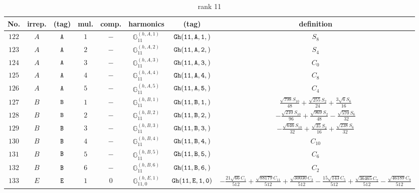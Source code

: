 \documentclass[fleqn,8pt]{jsarticle}
\begin{document}
\begin{table}[ht!]
\begin{center}
\caption{rank 11}
\renewcommand{\arraystretch}{1.3}
\begin{tabular}{cccccccc} \hline \hline
No. & irrep. & (tag) & mul. & comp. & harmonics & (tag) & definition \\ \hline
$ 122 $ & $ A $ & $ {\tt A} $ & $ 1 $ & $ - $ & $ \mathbb{G}_{11}^{(h,A,1)} $ & $ {\tt Gh(11,A,1,)} $ & $ S_{8} $ \\
$ 123 $ & $ A $ & $ {\tt A} $ & $ 2 $ & $ - $ & $ \mathbb{G}_{11}^{(h,A,2)} $ & $ {\tt Gh(11,A,2,)} $ & $ S_{4} $ \\
$ 124 $ & $ A $ & $ {\tt A} $ & $ 3 $ & $ - $ & $ \mathbb{G}_{11}^{(h,A,3)} $ & $ {\tt Gh(11,A,3,)} $ & $ C_{0} $ \\
$ 125 $ & $ A $ & $ {\tt A} $ & $ 4 $ & $ - $ & $ \mathbb{G}_{11}^{(h,A,4)} $ & $ {\tt Gh(11,A,4,)} $ & $ C_{8} $ \\
$ 126 $ & $ A $ & $ {\tt A} $ & $ 5 $ & $ - $ & $ \mathbb{G}_{11}^{(h,A,5)} $ & $ {\tt Gh(11,A,5,)} $ & $ C_{4} $ \\
$ 127 $ & $ B $ & $ {\tt B} $ & $ 1 $ & $ - $ & $ \mathbb{G}_{11}^{(h,B,1)} $ & $ {\tt Gh(11,B,1,)} $ & $ \frac{\sqrt{798} S_{10}}{48} + \frac{\sqrt{255} S_{2}}{24} + \frac{3 \sqrt{6} S_{6}}{16} $ \\
$ 128 $ & $ B $ & $ {\tt B} $ & $ 2 $ & $ - $ & $ \mathbb{G}_{11}^{(h,B,2)} $ & $ {\tt Gh(11,B,2,)} $ & $ - \frac{\sqrt{210} S_{10}}{96} + \frac{\sqrt{969} S_{2}}{48} - \frac{\sqrt{570} S_{6}}{32} $ \\
$ 129 $ & $ B $ & $ {\tt B} $ & $ 3 $ & $ - $ & $ \mathbb{G}_{11}^{(h,B,3)} $ & $ {\tt Gh(11,B,3,)} $ & $ - \frac{\sqrt{646} S_{10}}{32} + \frac{\sqrt{35} S_{2}}{16} + \frac{\sqrt{238} S_{6}}{32} $ \\
$ 130 $ & $ B $ & $ {\tt B} $ & $ 4 $ & $ - $ & $ \mathbb{G}_{11}^{(h,B,4)} $ & $ {\tt Gh(11,B,4,)} $ & $ C_{10} $ \\
$ 131 $ & $ B $ & $ {\tt B} $ & $ 5 $ & $ - $ & $ \mathbb{G}_{11}^{(h,B,5)} $ & $ {\tt Gh(11,B,5,)} $ & $ C_{6} $ \\
$ 132 $ & $ B $ & $ {\tt B} $ & $ 6 $ & $ - $ & $ \mathbb{G}_{11}^{(h,B,6)} $ & $ {\tt Gh(11,B,6,)} $ & $ C_{2} $ \\
$ 133 $ & $ E $ & $ {\tt E} $ & $ 1 $ & $ 0 $ & $ \mathbb{G}_{11,0}^{(h,E,1)} $ & $ {\tt Gh(11,E,1,0)} $ & $ - \frac{21 \sqrt{66} C_{1}}{512} + \frac{\sqrt{88179} C_{11}}{512} + \frac{\sqrt{30030} C_{3}}{512} - \frac{15 \sqrt{143} C_{5}}{512} + \frac{\sqrt{36465} C_{7}}{512} - \frac{\sqrt{46189} C_{9}}{512} $ \\

\end{tabular}
\end{center}
\end{table}
\end{document}
